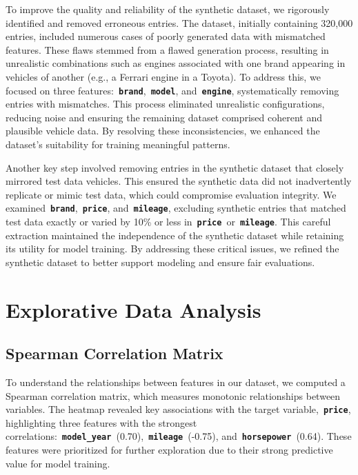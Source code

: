 \documentclass[a4paper,oneside,bibliography=totoc]{scrbook}
\begin{document}
To improve the quality and reliability of the synthetic dataset, we rigorously identified and removed erroneous entries. The dataset, initially containing 320,000 entries, included numerous cases of poorly generated data with mismatched features. These flaws stemmed from a flawed generation process, resulting in unrealistic combinations such as engines associated with one brand appearing in vehicles of another (e.g., a Ferrari engine in a Toyota). To address this, we focused on three features:~\textbf{\texttt{brand}},~\textbf{\texttt{model}}, and~\textbf{\texttt{engine}}, systematically removing entries with mismatches. This process eliminated unrealistic configurations, reducing noise and ensuring the remaining dataset comprised coherent and plausible vehicle data. By resolving these inconsistencies, we enhanced the dataset's suitability for training meaningful patterns.

Another key step involved removing entries in the synthetic dataset that closely mirrored test data vehicles. This ensured the synthetic data did not inadvertently replicate or mimic test data, which could compromise evaluation integrity. We examined~\textbf{\texttt{brand}},~\textbf{\texttt{price}}, and~\textbf{\texttt{mileage}}, excluding synthetic entries that matched test data exactly or varied by 10\% or less in~\textbf{\texttt{price}}~or~\textbf{\texttt{mileage}}. This careful extraction maintained the independence of the synthetic dataset while retaining its utility for model training. By addressing these critical issues, we refined the synthetic dataset to better support modeling and ensure fair evaluations.

\chapter{Explorative Data Analysis}
\label{cha:explorativeDataAnalysis}

\section{Spearman Correlation Matrix}
\label{sec:spearmanCorrelationMatrix}

To understand the relationships between features in our dataset, we computed a Spearman correlation matrix, which measures monotonic relationships between variables. The heatmap revealed key associations with the target variable,~\textbf{\texttt{price}}, highlighting three features with the strongest correlations:~\textbf{\texttt{model\_year}}~(0.70),~\textbf{\texttt{mileage}}~(-0.75), and~\textbf{\texttt{horsepower}}~(0.64). These features were prioritized for further exploration due to their strong predictive value for model training.
\end{document}
